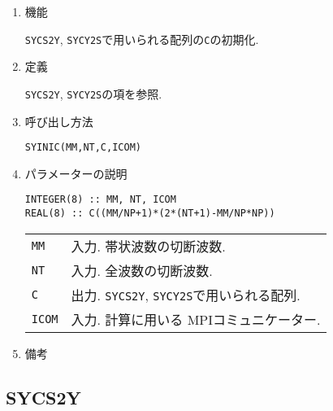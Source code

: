 \documentclass[a4j]{jsarticle}
\begin{document}
\begin{enumerate}

\item 機能 

\texttt{SYCS2Y}, \texttt{SYCY2S}で用いられる配列の\texttt{C}の初期化.

\item 定義

\texttt{SYCS2Y}, \texttt{SYCY2S}の項を参照.

\item 呼び出し方法 

\texttt{SYINIC(MM,NT,C,ICOM)}
  
\item パラメーターの説明

\begin{verbatim}
INTEGER(8) :: MM, NT, ICOM
REAL(8) :: C((MM/NP+1)*(2*(NT+1)-MM/NP*NP))
\end{verbatim}

\begin{tabular}{ll}
\texttt{MM} & 入力. 帯状波数の切断波数.\\    
\texttt{NT} & 入力. 全波数の切断波数.\\
\texttt{C} & 出力. \texttt{SYCS2Y}, \texttt{SYCY2S}で用いられる配列.\\
\texttt{ICOM} & 入力. 計算に用いる MPIコミュニケーター.
\end{tabular}

\item 備考

\end{enumerate}


\subsection{SYCS2Y}
\end{document}
